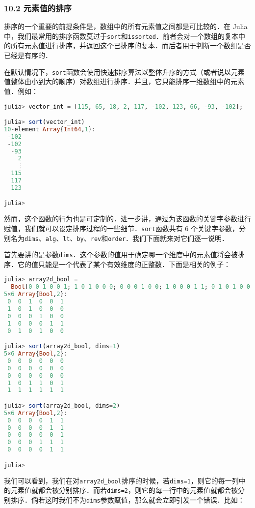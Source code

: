 

\subsubsection{10.2 元素值的排序}

排序的一个重要的前提条件是，数组中的所有元素值之间都是可比较的．在 Julia 中，我们最常用的排序函数莫过于\verb|sort|和\verb|issorted|．前者会对一个数组的复本中的所有元素值进行排序，并返回这个已排序的复本．而后者用于判断一个数组是否已经是有序的．

在默认情况下，\verb|sort|函数会使用快速排序算法以整体升序的方式（或者说以元素值整体由小到大的顺序）对数组进行排序．并且，它只能排序一维数组中的元素值．例如：

\begin{lstlisting}[language=julia]
julia> vector_int = [115, 65, 18, 2, 117, -102, 123, 66, -93, -102];

julia> sort(vector_int)
10-element Array{Int64,1}:
 -102
 -102
  -93
    2
    ⋮
  115
  117
  123

julia>
\end{lstlisting}

然而，这个函数的行为也是可定制的．进一步讲，通过为该函数的关键字参数进行赋值，我们就可以设定排序过程的一些细节．\verb|sort|函数共有 6 个关键字参数，分别名为\verb|dims|、\verb|alg|、\verb|lt|、\verb|by|、\verb|rev|和\verb|order|．我们下面就来对它们逐一说明．

首先要讲的是参数\verb|dims|．这个参数的值用于确定哪一个维度中的元素值将会被排序．它的值只能是一个代表了某个有效维度的正整数．下面是相关的例子：

\begin{lstlisting}[language=julia]
julia> array2d_bool = 
  Bool[0 0 1 0 0 1; 1 0 1 0 0 0; 0 0 0 1 0 0; 1 0 0 0 1 1; 0 1 0 1 0 0]
5×6 Array{Bool,2}:
 0  0  1  0  0  1
 1  0  1  0  0  0
 0  0  0  1  0  0
 1  0  0  0  1  1
 0  1  0  1  0  0

julia> sort(array2d_bool, dims=1)
5×6 Array{Bool,2}:
 0  0  0  0  0  0
 0  0  0  0  0  0
 0  0  0  0  0  0
 1  0  1  1  0  1
 1  1  1  1  1  1

julia> sort(array2d_bool, dims=2)
5×6 Array{Bool,2}:
 0  0  0  0  1  1
 0  0  0  0  1  1
 0  0  0  0  0  1
 0  0  0  1  1  1
 0  0  0  0  1  1

julia> 
\end{lstlisting}

我们可以看到，我们在对\verb|array2d_bool|排序的时候，若\verb|dims=1|，则它的每一列中的元素值就都会被分别排序．而若\verb|dims=2|，则它的每一行中的元素值就都会被分别排序．倘若这时我们不为\verb|dims|参数赋值，那么就会立即引发一个错误．比如：

